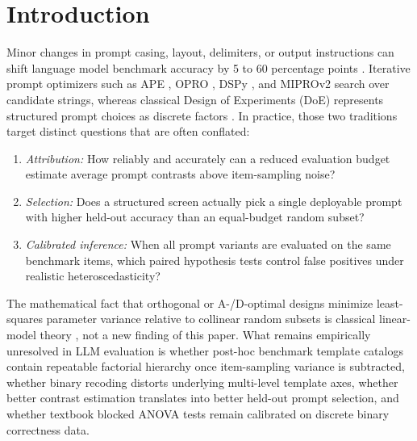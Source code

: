 \documentclass[11pt,a4paper]{article}
\begin{document}
\section{Introduction}
Minor changes in prompt casing, layout, delimiters, or output instructions can shift language model benchmark accuracy by 5 to 60 percentage points \citep{sclar2024quantifying,mizrahi2024state,polo2024efficient,habba2025dove}. Iterative prompt optimizers such as APE \citep{zhou2023large}, OPRO \citep{yang2023large}, DSPy \citep{khattab2024dspy}, and MIPROv2 \citep{opsahl2024optimizing} search over candidate strings, whereas classical Design of Experiments (DoE) represents structured prompt choices as discrete factors \citep{box2005statistics,montgomery2017design,wu2011experiments}. In practice, those two traditions target distinct questions that are often conflated:
\begin{enumerate}[leftmargin=*,nosep]
    \item \emph{Attribution:} How reliably and accurately can a reduced evaluation budget estimate average prompt contrasts above item-sampling noise?
    \item \emph{Selection:} Does a structured screen actually pick a single deployable prompt with higher held-out accuracy than an equal-budget random subset?
    \item \emph{Calibrated inference:} When all prompt variants are evaluated on the same benchmark items, which paired hypothesis tests control false positives under realistic heteroscedasticity?
\end{enumerate}

The mathematical fact that orthogonal or A-/D-optimal designs minimize least-squares parameter variance relative to collinear random subsets is classical linear-model theory \citep{plackett1946design,fedorov1972theory,atkinson2007optimum}, not a new finding of this paper. What remains empirically unresolved in LLM evaluation is whether post-hoc benchmark template catalogs contain repeatable factorial hierarchy once item-sampling variance is subtracted, whether binary recoding distorts underlying multi-level template axes, whether better contrast estimation translates into better held-out prompt selection, and whether textbook blocked ANOVA tests remain calibrated on discrete binary correctness data.
\end{document}
